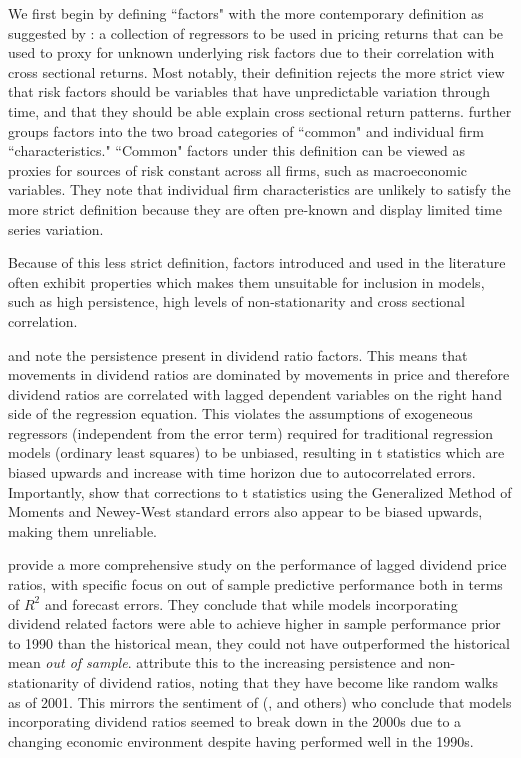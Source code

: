 \documentclass[a4paper, table]{article}
\begin{document}
We first begin by defining ``factors" with the more contemporary definition as suggested by \cite{harvey__2016}: a collection of regressors to be used in pricing returns that can be used to proxy for unknown underlying risk factors due to their correlation with cross sectional returns. Most notably, their definition rejects the more strict view that risk factors should be variables that have unpredictable variation through time, and that they should be able explain cross sectional return patterns. \cite{harvey__2016} further groups factors into the two broad categories of ``common" and individual firm ``characteristics." ``Common" factors under this definition can be viewed as proxies for sources of risk constant across all firms, such as macroeconomic variables. They note that individual firm characteristics are unlikely to satisfy the more strict definition because they are often pre-known and display limited time series variation.

Because of this less strict definition, factors introduced and used in the literature often exhibit properties which makes them unsuitable for inclusion in models, such as high persistence, high levels of non-stationarity and cross sectional correlation. 

\cite{goetzmann_testing_1993} and \cite{ang_stock_2006} note the persistence present in dividend ratio factors. This means that movements in dividend ratios are dominated by movements in price and therefore dividend ratios are correlated with lagged dependent variables on the right hand side of the regression equation. This violates the assumptions of exogeneous regressors (independent from the error term) required for traditional regression models (ordinary least squares) to be unbiased, resulting in t statistics which are biased upwards and increase with time horizon due to autocorrelated errors. Importantly, \cite{goetzmann_testing_1993} show that corrections to t statistics using the Generalized Method of Moments and Newey-West standard errors also appear to be biased upwards, making them unreliable. 

\cite{goyal_predicting_2003} provide a more comprehensive study on the performance of lagged dividend price ratios, with specific focus on out of sample predictive performance both in terms of $R^2$ and forecast errors. They conclude that while models incorporating dividend related factors were able to achieve higher in sample performance prior to 1990 than the historical mean, they could not have outperformed the historical mean \textit{out of sample}. \cite{goyal_predicting_2003} attribute this to the increasing persistence and non-stationarity of dividend ratios, noting that they have become like random walks as of 2001. This mirrors the sentiment of (\cite{lettau_consumption_2001}, \cite{schwert_anomalies_2003} and others) who conclude that models incorporating dividend ratios seemed to break down in the 2000s due to a changing economic environment despite having performed well in the 1990s.
\end{document}
